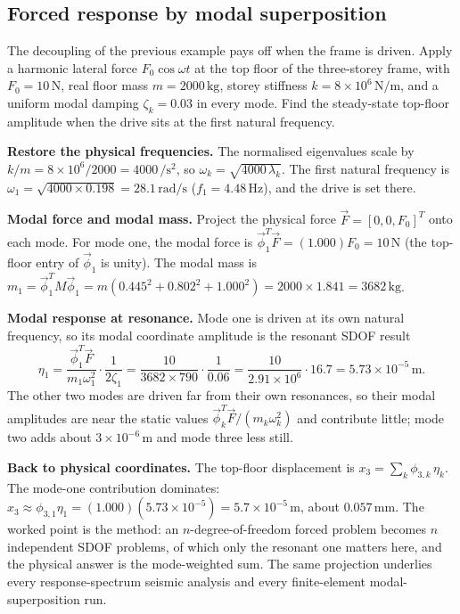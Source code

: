 \subsection{Forced response by modal superposition}

The decoupling of the previous example pays off when the frame is
driven. Apply a harmonic lateral force $F_0\cos\omega t$ at the top
floor of the three-storey frame, with $F_0 = 10\,\text{N}$, real floor
mass $m = 2000\,\si{\kilogram}$, storey stiffness $k = 8\times 10^6\,\si{
\newton\per\meter}$, and a uniform modal damping $\zeta_k = 0.03$ in
every mode. Find the steady-state top-floor amplitude when the drive
sits at the first natural frequency.

\textbf{Restore the physical frequencies.} The normalised eigenvalues
scale by $k/m = 8\times 10^6/2000 = 4000\,\si{\per\second\squared}$, so
$\omega_k = \sqrt{4000\,\lambda_k}$. The first natural frequency is
$\omega_1 = \sqrt{4000\times 0.198} = 28.1\,\si{\radian\per\second}$
($f_1 = 4.48\,\si{\hertz}$), and the drive is set there.

\textbf{Modal force and modal mass.} Project the physical force
$\vec F = [0, 0, F_0]^T$ onto each mode. For mode one, the modal force
is $\vec\phi_1^T\vec F = (1.000)F_0 = 10\,\text{N}$ (the top-floor entry
of $\vec\phi_1$ is unity). The modal mass is $m_1 = \vec\phi_1^T M
\vec\phi_1 = m(0.445^2 + 0.802^2 + 1.000^2) = 2000\times 1.841 =
3682\,\si{\kilogram}$.

\textbf{Modal response at resonance.} Mode one is driven at its own
natural frequency, so its modal coordinate amplitude is the resonant
SDOF result
\[
\eta_1 = \frac{\vec\phi_1^T\vec F}{m_1\omega_1^2}\cdot\frac{1}{2\zeta_1}
= \frac{10}{3682\times 790}\cdot\frac{1}{0.06} = \frac{10}{2.91\times
10^6}\cdot 16.7 = 5.73\times 10^{-5}\,\si{\meter}.
\]
The other two modes are driven far from their own resonances, so their
modal amplitudes are near the static values $\vec\phi_k^T\vec
F/(m_k\omega_k^2)$ and contribute little; mode two adds about $3\times
10^{-6}\,\si{\meter}$ and mode three less still.

\textbf{Back to physical coordinates.} The top-floor displacement is
$x_3 = \sum_k \phi_{3,k}\,\eta_k$. The mode-one contribution dominates:
$x_3 \approx \phi_{3,1}\eta_1 = (1.000)(5.73\times 10^{-5}) =
5.7\times 10^{-5}\,\si{\meter}$, about $0.057\,\si{\milli\meter}$. The
worked point is the method: an $n$-degree-of-freedom forced problem
becomes $n$ independent SDOF problems, of which only the resonant one
matters here, and the physical answer is the mode-weighted sum. The same
projection underlies every response-spectrum seismic analysis and every
finite-element modal-superposition run.

